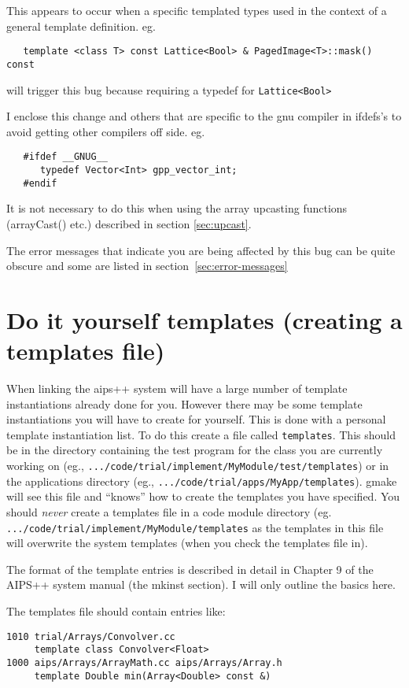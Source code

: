 This appears to occur when a specific templated types used in the context
of a general template definition. eg.
\begin{verbatim}
   template <class T> const Lattice<Bool> & PagedImage<T>::mask() const
\end{verbatim}
will trigger this bug because requiring a typedef for \texttt{Lattice<Bool>}

I enclose this change and others that are specific to the gnu compiler in
ifdefs's to avoid getting other compilers off side. eg.
\begin{verbatim}
   #ifdef __GNUG__
      typedef Vector<Int> gpp_vector_int;
   #endif
\end{verbatim}
It is not necessary to do this when using the array upcasting functions
(arrayCast() etc.) described in section \ref{sec:upcast}.

The error messages that indicate you are being affected by this bug can be
quite obscure and some are listed in section~\ref{sec:error-messages}

\section{Do it yourself templates (creating a templates file)}
When linking the aips++ system will have a large number of template
instantiations already done for you. However there may be some
template instantiations you will have to create for yourself. This is
done with a personal template instantiation list. To do this create a
file called \texttt{templates}. This should be in the directory
containing the test program for the class you are currently working on
(eg., \texttt{.../code/trial/implement/MyModule/test/templates}) or in
the applications directory (eg.,
\texttt{.../code/trial/apps/MyApp/templates}). gmake will see this
file and ``knows'' how to create the templates you have specified. You
should \emph{never} create a templates file in a code module directory
(eg.  \texttt{.../code/trial/implement/MyModule/templates} as the
templates in this file will overwrite the system templates (when you
check the templates file in).

The format of the template entries is described in detail in Chapter 9
of the AIPS++ system manual (the mkinst section).  
I will only outline the basics  here.

The templates file should contain entries like:
\begin{verbatim}
1010 trial/Arrays/Convolver.cc 
     template class Convolver<Float>
1000 aips/Arrays/ArrayMath.cc aips/Arrays/Array.h
     template Double min(Array<Double> const &)
\end{verbatim}


